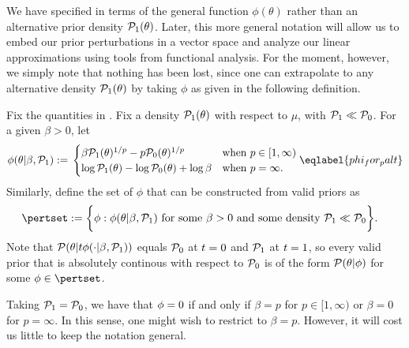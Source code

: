 We have specified  in terms of the general function
$\phi(\theta)$ rather than an alternative prior density $\mathcal{P}_{1}(\theta)$. Later,
this more general notation will allow us to embed our prior perturbations in a
vector space and analyze our linear approximations using tools from functional
analysis.  For the moment, however, we simply note that nothing has been lost,
since one can extrapolate to any alternative density $\mathcal{P}_{1}(\theta)$ by taking
$\phi$ as given in the following definition.


\begin{defn}
%
Fix the quantities in .  Fix a density $\mathcal{P}_{1}(\theta)$
with respect to $\mu$, with $\mathcal{P}_{1} \ll \mathcal{P}_{0}$. For a given $\beta > 0$, let
%
\begin{align}
%
\phi(\theta | \beta, \palt) :={}
\begin{cases}
\beta \palt(\theta)^{1/p} - p \pbase(\theta)^{1/p}
    & \textrm{when }p \in [1, \infty) \\
\log \palt(\theta) - \log \pbase(\theta) + \log \beta
    & \textrm{when }p = \infty.
\end{cases} \eqlabel{phi_for_palt}
%
\end{align}
%
Similarly, define the set of $\phi$ that can be constructed from
valid priors as
%
\begin{align*}
%
\pertset := \bigg\{&
    \phi:  \phi(\theta | \beta, \palt) %
    \textrm{ for some }\beta > 0\textrm{ and some density }\palt \ll \pbase
\bigg\}.
%
\end{align*}
%
Note that $\mathcal{P}(\theta \vert t \phi(\cdot \vert \beta, \mathcal{P}_{1}))$ equals $\mathcal{P}_{0}$
at $t = 0$ and $\mathcal{P}_{1}$ at $t = 1$, so every valid prior that is absolutely
continous with respect to $\mathcal{P}_{0}$ is of the form $\mathcal{P}(\theta \vert \phi)$ for
some $\phi \in \pertset$.
%
\end{defn}



\begin{ex}
%
Taking $\mathcal{P}_{1} = \mathcal{P}_{0}$, we have that $\phi = 0$ if and only if $\beta = p$
for $p \in [1, \infty)$ or $\beta = 0$ for $p = \infty$. In this sense, one
might wish to restrict to $\beta = p$.  However, it will cost us little to keep
the notation general.
%
\end{ex}

